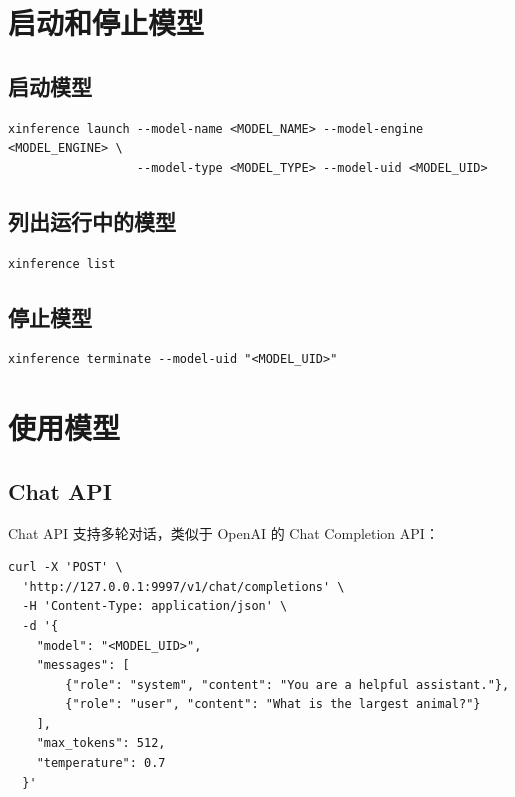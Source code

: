 \documentclass[12pt,UTF8]{ctexbook}
\begin{document}
\section{启动和停止模型}
\label{sec:start_stop_models}

\subsection{启动模型}

\begin{lstlisting}
xinference launch --model-name <MODEL_NAME> --model-engine <MODEL_ENGINE> \
                  --model-type <MODEL_TYPE> --model-uid <MODEL_UID>
\end{lstlisting}

\subsection{列出运行中的模型}

\begin{lstlisting}
xinference list
\end{lstlisting}

\subsection{停止模型}

\begin{lstlisting}
xinference terminate --model-uid "<MODEL_UID>"
\end{lstlisting}

\section{使用模型}
\label{sec:use_models}

\subsection{Chat API}

Chat API 支持多轮对话，类似于 OpenAI 的 Chat Completion API：

\begin{lstlisting}
curl -X 'POST' \
  'http://127.0.0.1:9997/v1/chat/completions' \
  -H 'Content-Type: application/json' \
  -d '{
    "model": "<MODEL_UID>",
    "messages": [
        {"role": "system", "content": "You are a helpful assistant."},
        {"role": "user", "content": "What is the largest animal?"}
    ],
    "max_tokens": 512,
    "temperature": 0.7
  }'
\end{lstlisting}
\end{document}
